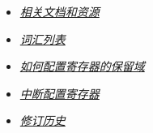 \documentclass[openany, 10pt]{book}
\begin{document}
\begin{itemize}
    \item \hyperref[sec:resources]{\textit{相关文档和资源}}
    \item \hyperref[glossary]{\textit{词汇列表}}
    \item \hyperref[programming-reserved-field]{\textit{如何配置寄存器的保留域}}
    \item \hyperref[interrupt-config-registers]{\textit{中断配置寄存器}}
    \item \hyperref[revision-history]{\textit{修订历史}}
\end{itemize}



\clearpage


\clearpage


\clearpage


\clearpage


\clearpage


\clearpage

\end{document}
